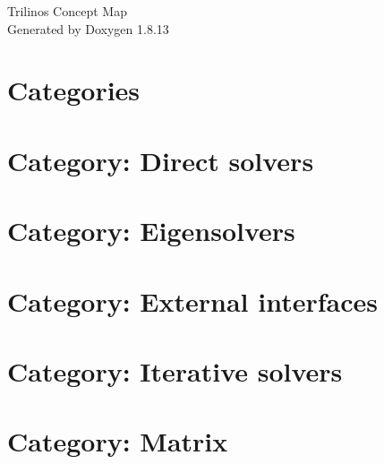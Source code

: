 \documentclass[twoside]{book}
\newcommand{\+}{\discretionary{\mbox{\scriptsize$\hookleftarrow$}}{}{}}
\newcommand{\clearemptydoublepage}{%
  \newpage{\pagestyle{empty}\cleardoublepage}%
}
\begin{document}
\hypersetup{pageanchor=false,
             bookmarksnumbered=true,
             pdfencoding=unicode
            }
\begin{titlepage}
\vspace*{7cm}
\begin{center}%
{\Large Trilinos Concept Map }\\
\vspace*{1cm}
{\large Generated by Doxygen 1.8.13}\\
\end{center}
\end{titlepage}
\clearemptydoublepage
{}
\tableofcontents
\clearemptydoublepage
{}
\hypersetup{pageanchor=true}

\chapter{Categories}
\label{md_markdown_categories}

\chapter{Category\+: Direct solvers}
\label{md_markdown_category_direct_solvers}

\chapter{Category\+: Eigensolvers}
\label{md_markdown_category_eigensolvers}

\chapter{Category\+: External interfaces}
\label{md_markdown_category_external_interfaces}

\chapter{Category\+: Iterative solvers}
\label{md_markdown_category_iterative_solvers}

\chapter{Category\+: Matrix}
\label{md_markdown_category_matrix}

\end{document}
